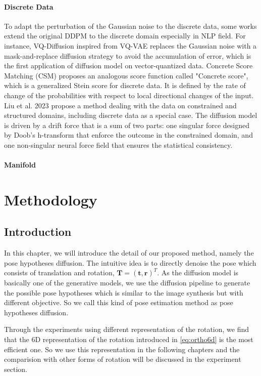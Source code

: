 \documentclass[12pt,DIV14,BCOR12mm,a4paper,footinclude=false,headinclude,parskip=half-,twoside,openright,cleardoublepage=empty,toc=index,bibliography=totoc,listof=totoc]{scrreprt}
\numberwithin{equation}{chapter}
\begin{document}
\subsubsection{Discrete Data}
To adapt the perturbation of the Gaussian noise to the discrete data, some works extend the original DDPM to the discrete domain especially in NLP field. For instance, VQ-Diffusion \cite{gu2022vector} inspired from VQ-VAE \cite{oord2018neural} replaces the Gaussian noise with a mask-and-replace diffusion strategy to avoid the accumulation of error, which is the first application of diffusion model on vector-quantized data. Concrete Score Matching (CSM) \cite{meng2023distillation} proposes an analogous score function called "Concrete score", which is a generalized Stein score for discrete data. It is defined by the rate of change of the probabilities with respect to local directional changes of the input. Liu et al. 2023 \cite{liu2023learning} propose a method dealing with the data on constrained and structured domains, including discrete data as a special case. The diffusion model is driven by a drift force that is a sum of two parts: one singular force designed by Doob's h-transform that enforce the outcome in the constrained domain, and one non-singular neural force field that ensures the statistical consistency.
\subsubsection{Manifold}

\chapter{Methodology}
\section{Introduction}
In this chapter, we will introduce the detail of our proposed method, namely the pose hypotheses diffusion. The intuitive idea is to directly denoise the pose which consists of translation and rotation, $\mathbf{T} = (\mathbf{t}, \mathbf{r})^{T}$. As the diffusion model is basically one of the generative models, we use the diffusion pipeline to generate the possible pose hypotheses which is similar to the image synthesis but with different objective. So we call this kind of pose estimation method as pose hypotheses diffusion.

Through the experiments using different representation of the rotation, we find that the 6D representation of the rotation introduced in \ref{eq:ortho6d} is the most efficient one. So we use this representation in the following chapters and the comparision with other forms of rotation will be discussed in the experiment section.
\end{document}
